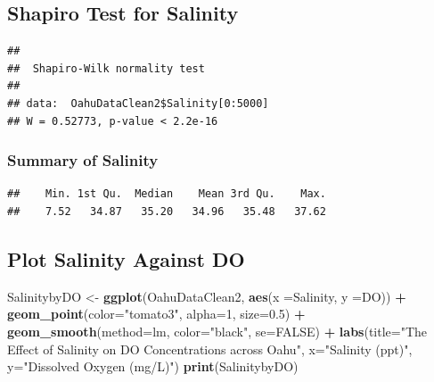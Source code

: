 \documentclass[12pt,]{article}
\newenvironment{Shaded}{\begin{snugshade}}{\end{snugshade}}
\newcommand{\KeywordTok}[1]{\textcolor[rgb]{0.13,0.29,0.53}{\textbf{#1}}}
\newcommand{\DataTypeTok}[1]{\textcolor[rgb]{0.13,0.29,0.53}{#1}}
\newcommand{\DecValTok}[1]{\textcolor[rgb]{0.00,0.00,0.81}{#1}}
\newcommand{\FloatTok}[1]{\textcolor[rgb]{0.00,0.00,0.81}{#1}}
\newcommand{\StringTok}[1]{\textcolor[rgb]{0.31,0.60,0.02}{#1}}
\newcommand{\OtherTok}[1]{\textcolor[rgb]{0.56,0.35,0.01}{#1}}
\newcommand{\OperatorTok}[1]{\textcolor[rgb]{0.81,0.36,0.00}{\textbf{#1}}}
\newcommand{\NormalTok}[1]{#1}
\begin{document}
\subsection{Shapiro Test for Salinity}\label{shapiro-test-for-salinity}

\begin{Shaded}
\end{Shaded}

\begin{verbatim}
## 
##  Shapiro-Wilk normality test
## 
## data:  OahuDataClean2$Salinity[0:5000]
## W = 0.52773, p-value < 2.2e-16
\end{verbatim}

\subsubsection{Summary of Salinity}\label{summary-of-salinity}

\begin{Shaded}
\end{Shaded}

\begin{verbatim}
##    Min. 1st Qu.  Median    Mean 3rd Qu.    Max. 
##    7.52   34.87   35.20   34.96   35.48   37.62
\end{verbatim}

\subsection{Plot Salinity Against DO}\label{plot-salinity-against-do}

\begin{Shaded}
\begin{Highlighting}[]
\NormalTok{SalinitybyDO <-}\StringTok{ }
\StringTok{  }\KeywordTok{ggplot}\NormalTok{(OahuDataClean2, }\KeywordTok{aes}\NormalTok{(}\DataTypeTok{x =}\NormalTok{Salinity, }\DataTypeTok{y =}\NormalTok{DO)) }\OperatorTok{+}
\StringTok{  }\KeywordTok{geom_point}\NormalTok{(}\DataTypeTok{color=}\StringTok{"tomato3"}\NormalTok{, }\DataTypeTok{alpha=}\DecValTok{1}\NormalTok{, }\DataTypeTok{size=}\FloatTok{0.5}\NormalTok{) }\OperatorTok{+}
\StringTok{  }\KeywordTok{geom_smooth}\NormalTok{(}\DataTypeTok{method=}\NormalTok{lm, }\DataTypeTok{color=}\StringTok{"black"}\NormalTok{, }\DataTypeTok{se=}\OtherTok{FALSE}\NormalTok{) }\OperatorTok{+}
\StringTok{  }\KeywordTok{labs}\NormalTok{(}\DataTypeTok{title=}\StringTok{"The Effect of Salinity on DO Concentrations across Oahu"}\NormalTok{, }\DataTypeTok{x=}\StringTok{"Salinity (ppt)"}\NormalTok{, }\DataTypeTok{y=}\StringTok{"Dissolved Oxygen (mg/L)"}\NormalTok{)}
\KeywordTok{print}\NormalTok{(SalinitybyDO) }
\end{Highlighting}
\end{Shaded}
\end{document}
